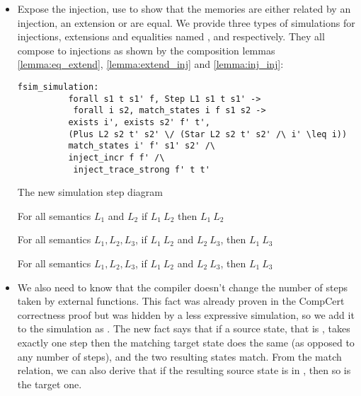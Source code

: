 \begin{itemize}
\item Expose the injection, use  to show that the memories are either related by an injection, an extension or are equal. We provide three types of simulations for injections, extensions and equalities named ,  and  respectively. They all compose to injections as shown by the composition lemmas \ref{lemma:eq_extend}, \ref{lemma:extend_inj} and \ref{lemma:inj_inj}:
\begin{table}\centering
\begin{lstlisting}[style=CoqTheorem-list]
fsim_simulation:
          forall s1 t s1' f, Step L1 s1 t s1' ->
           forall i s2, match_states i f s1 s2 ->
          exists i', exists s2' f' t',
          (Plus L2 s2 t' s2' \/ (Star L2 s2 t' s2' /\ i' \leq i))
          match_states i' f' s1' s2' /\
          inject_incr f f' /\
           inject_trace_strong f' t t'
  \end{lstlisting}
\caption{The new simulation step diagram}\label{code:sec:step_diagram_sim}
\end{table}

\begin{lemma}\label{lemma:eq_extend}
For all semantics $L_1$ and $L_2$ if  $L_1 \ L_2$ then  $L_1 \ L_2$\end{lemma} 
\begin{lemma}\label{lemma:extend_inj}
For all semantics $L_1, L_2, L_3$, if \Coqcode{extend_sim} $L_1 \ L_2$ and \Coqcode{inject_sim} $L_2 \ L_3$, then \Coqcode{inject_sim} $L_1 \ L_3$
\end{lemma} 
\begin{lemma}\label{lemma:inj_inj}
For all semantics $L_1, L_2, L_3$, if  $L_1 \ L_2$ and  $L_2 \ L_3$, then  $L_1 \ L_3$
\end{lemma} 



\item We also need to know that the compiler doesn't change the number of steps taken by external functions. This fact was already proven in the CompCert correctness proof but was hidden by a less expressive simulation, so we add it to the simulation as . The new fact says that if a source state, that is , takes exactly one step then the matching target state does the same (as opposed to any number of steps), and the two resulting states match. From the match relation, we can also derive that if the resulting source state is in , then so is the target one.


\end{itemize}
